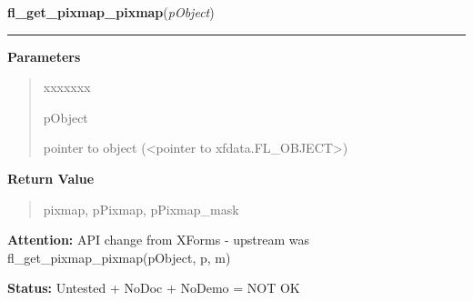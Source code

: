 \hspace{.8\funcindent}\begin{boxedminipage}{\funcwidth}

    \raggedright \textbf{fl\_get\_pixmap\_pixmap}(\textit{pObject})

    \vspace{-1.5ex}

    \rule{\textwidth}{0.5\fboxrule}
\setlength{\parskip}{2ex}
\setlength{\parskip}{1ex}
      \textbf{Parameters}
      \vspace{-1ex}

      \begin{quote}
        \begin{Ventry}{xxxxxxx}

          \item[pObject]

          pointer to object ({\textless}pointer to 
          xfdata.FL\_OBJECT{\textgreater})

        \end{Ventry}

      \end{quote}

      \textbf{Return Value}
    \vspace{-1ex}

      \begin{quote}
      pixmap, pPixmap, pPixmap\_mask

      \end{quote}

\textbf{Attention:} API change from XForms - upstream was fl\_get\_pixmap\_pixmap(pObject, p, 
m)



\textbf{Status:} Untested + NoDoc + NoDemo = NOT OK



    \end{boxedminipage}

    \label{xformslib:library:fl_get_pixmap_pixmap}

    \vspace{0.5ex}

